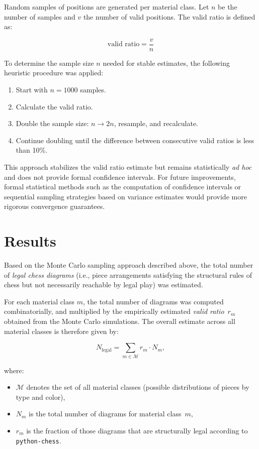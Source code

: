\documentclass[12pt]{article}
\begin{document}
Random samples of positions are generated per material class. 
Let $n$ be the number of samples and $v$ the number of valid positions. 
The valid ratio is defined as:

\begin{equation}
\text{valid ratio} = \frac{v}{n}
\end{equation}

To determine the sample size $n$ needed for stable estimates, the following heuristic procedure was applied:

\begin{enumerate}
    \item Start with $n = 1000$ samples.
    \item Calculate the valid ratio.
    \item Double the sample size: $n \rightarrow 2n$, resample, and recalculate.
    \item Continue doubling until the difference between consecutive valid ratios is less than 10\%.
\end{enumerate}

\noindent
This approach stabilizes the valid ratio estimate but remains statistically \emph{ad hoc} and 
does not provide formal confidence intervals. For future improvements, formal 
statistical methods such as the computation of confidence intervals or sequential 
sampling strategies based on variance estimates would provide more rigorous 
convergence guarantees.

\section{Results}

Based on the Monte Carlo sampling approach described above, the total number of \emph{legal chess diagrams} (i.e., piece arrangements satisfying the structural rules of chess but not necessarily reachable by legal play) was estimated.

For each material class $m$, the total number of diagrams was computed combinatorially, and multiplied by the empirically estimated \emph{valid ratio}~$r_m$ obtained from the Monte Carlo simulations.  
The overall estimate across all material classes is therefore given by:

\[
N_{\text{legal}} = \sum_{m \in \mathcal{M}} r_m \cdot N_m,
\]

where:
\begin{itemize}
    \item $\mathcal{M}$ denotes the set of all material classes (possible distributions of pieces by type and color),
    \item $N_m$ is the total number of diagrams for material class~$m$,
    \item $r_m$ is the fraction of those diagrams that are structurally legal according to \texttt{python-chess}.
\end{itemize}
\end{document}
